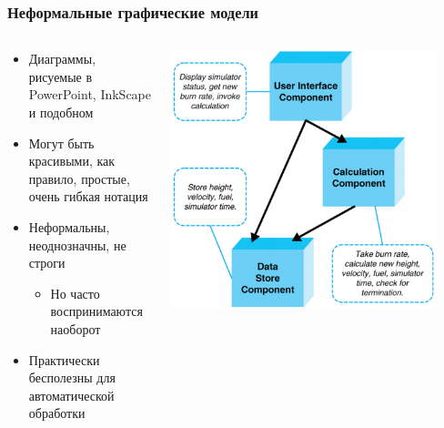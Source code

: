 \documentclass{../../slides-style}
\begin{document}
    \begin{frame}
        \frametitle{Неформальные графические модели}
        \begin{columns}
            \begin{column}{0.5\textwidth}
                \begin{itemize}
                    \item Диаграммы, рисуемые в PowerPoint, InkScape и подобном
                    \item Могут быть красивыми, как правило, простые, очень гибкая нотация
                    \item Неформальны, неоднозначны, не строги
                    \begin{itemize}
                        \item Но часто воспринимаются наоборот
                    \end{itemize}
                    \item Практически бесполезны для автоматической обработки
                \end{itemize}
            \end{column}
            \begin{column}{0.5\textwidth}
                \begin{center}
                    \includegraphics[width=0.9\textwidth]{informalModel.png}
                \end{center}
            \end{column}
        \end{columns}
    \end{frame}
\end{document}

